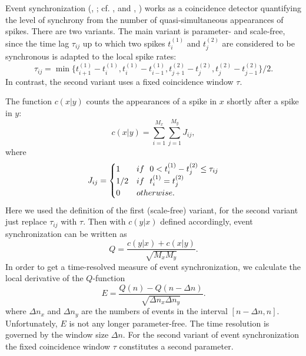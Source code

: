 \documentclass[10pt,twocolumn]{elsart5p}
\begin{document}
\begin{appendix}
Event synchronization (\citeauthor{QuianQuiroga02b}, \citeyear{QuianQuiroga02b}; cf. \citeauthor{Kreuz07c}, \citeyear{Kreuz07c} and \citeauthor{Kreuz11b}, \citeyear{Kreuz11b}) works as a coincidence detector quantifying the level of synchrony from the number of quasi-simultaneous appearances of spikes. There are two variants. The main variant is parameter- and scale-free, since the time lag $\tau_{ij}$ up to which two spikes $t_i^{(1)}$ and $t_j^{(2)}$ are considered to be synchronous is adapted to the local spike rates:
%
\begin{equation} \label{eq:Event-MaxDist}
    \tau_{ij} = \min \{t_{i+1}^{(1)} - t_i^{(1)}, t_i^{(1)} - t_{i-1}^{(1)},
                           t_{j+1}^{(2)} - t_j^{(2)}, t_j^{(2)} - t_{j-1}^{(2)}\}/2.
\end{equation}
%
In contrast, the second variant uses a fixed coincidence window $\tau$.

The function $c(x|y)$ counts the appearances of a spike in $x$ shortly after a spike in $y$:
%
\begin{equation} \label{eq:Event-Count}
    c (x|y) = \sum_{i=1}^{M_x} \sum_{j=1}^{M_y} J_{ij},
\end{equation}
%
where
%
\begin{equation} \label{eq:Event-Synchronicity}
    J_{ij} = \begin{cases}
                      1     & {\rm if} ~~ 0 < t_i^{(1)} - t_j^{(2)} \leq \tau_{ij} \cr
                      1/2   & {\rm if} ~~ t^{(1)}_i = t^{(2)}_j \cr
                      0     & {\rm otherwise}.
                  \end{cases}
\end{equation}
%
Here we used the definition of the first (scale-free) variant, for the second variant just replace $\tau_{ij}$ with $\tau$. Then with $c(y|x)$ defined accordingly, event synchronization can be written as
%
\begin{equation} \label{eq:Event-Synchro}
    Q = \frac {c (y|x) + c (x|y)} {\sqrt{M_x M_y}}.
\end{equation}
%
In order to get a time-resolved measure of event synchronization, we calculate the local derivative of the $Q$-function
%
\begin{equation} \label{eq:Window-Event-Synchro}
    E = \frac {Q (n) - Q (n-\Delta n)} {\sqrt{\Delta n_x \Delta n_y}}.
\end{equation}
%
where $\Delta n_x$ and $\Delta n_y$ are the numbers of events in the interval $[n-\Delta n, n]$. Unfortunately, $E$ is not any longer parameter-free. The time resolution is governed by the window size $\Delta n$. For the second variant of event synchronization the fixed coincidence window $\tau$ constitutes a second parameter.


\end{appendix}
\end{document}
